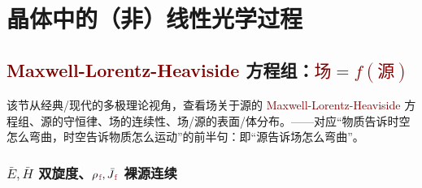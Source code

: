 \chapter{晶体中的（非）线性光学过程}\label{chap:N/LCO}

\vspace*{-8.5em}

\section{\textcolor{Maroon}{Maxwell-Lorentz-Heaviside} 方程组：\textcolor{Maroon}{$\text{场} = f(\text{源})$}}\label{sec:maxwell}

该节从经典/现代的多极理论视角，查看场关于源的 \textcolor{Maroon}{Maxwell-Lorentz-Heaviside} 方程组、源的守恒律、场的连续性、场/源的表面/体分布。——对应“物质告诉时空怎么弯曲，时空告诉物质怎么运动”的前半句：即“源告诉场怎么弯曲”。

\vspace*{-5.0em}

\subsection{$\bar{E},\bar{H}$ 双旋度、${\rho}_{\;\!\textcolor{Maroon}{\text{f}}}, \bar{J}_{\;\!\textcolor{Maroon}{\text{f}}}$ 裸源连续}\label{ssec:EHpJf}

